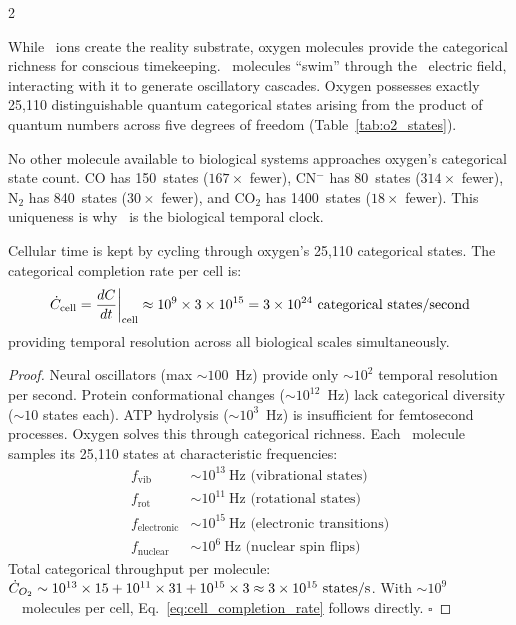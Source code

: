 \begin{multicols}{2}

While \Hplus\ ions create the reality substrate, oxygen molecules provide
the categorical richness for conscious timekeeping.  \Otwo\ molecules ``swim''
through the \Hplus\ electric field, interacting with it to generate oscillatory
cascades.  Oxygen possesses exactly 25,110 distinguishable quantum categorical
states arising from the product of quantum numbers across five degrees of
freedom (Table~\ref{tab:o2_states}).

\begin{proposition}
\label{prop:o2_richness}
No other molecule available to biological systems approaches oxygen's
categorical state count.  CO has 150~states ($167\times$ fewer), CN$^-$
has 80~states ($314\times$ fewer), N$_2$ has 840~states ($30\times$ fewer),
and CO$_2$ has 1400~states ($18\times$ fewer).  This uniqueness is why \Otwo\
is the biological temporal clock.
\end{proposition}

\begin{theorem}
\label{thm:oxygen_clock}
Cellular time is kept by cycling through oxygen's 25,110 categorical states.
The categorical completion rate per cell is:
\begin{equation}
\dot{C}_{\text{cell}} = \frac{dC}{dt}\bigg|_{\text{cell}}
  \approx 10^9 \times 3\times10^{15}
  = 3\times10^{24}~\text{categorical states/second}
\label{eq:cell_completion_rate}
\end{equation}
providing temporal resolution across all biological scales simultaneously.
\end{theorem}

\begin{proof}
Neural oscillators (max ${\sim}100$~Hz) provide only $\sim10^2$ temporal
resolution per second.  Protein conformational changes (${\sim}10^{12}$~Hz)
lack categorical diversity ($\sim10$ states each).  ATP hydrolysis (${\sim}10^3$~Hz)
is insufficient for femtosecond processes.  Oxygen solves this through
categorical richness.  Each \Otwo\ molecule samples its 25,110 states at
characteristic frequencies:
\begin{align}
f_{\text{vib}}      &\sim 10^{13}~\text{Hz (vibrational states)} \\
f_{\text{rot}}      &\sim 10^{11}~\text{Hz (rotational states)} \\
f_{\text{electronic}}&\sim 10^{15}~\text{Hz (electronic transitions)} \\
f_{\text{nuclear}}   &\sim 10^{6}~\text{Hz (nuclear spin flips)}
\end{align}
Total categorical throughput per molecule:
$\dot{C}_{O_2} \sim 10^{13}\times15 + 10^{11}\times31 + 10^{15}\times3
\approx 3\times10^{15}~\text{states/s}$.
With $\sim10^9$~\Otwo\ molecules per cell, Eq.~\eqref{eq:cell_completion_rate}
follows directly. $\square$
\end{proof}


\end{multicols}
